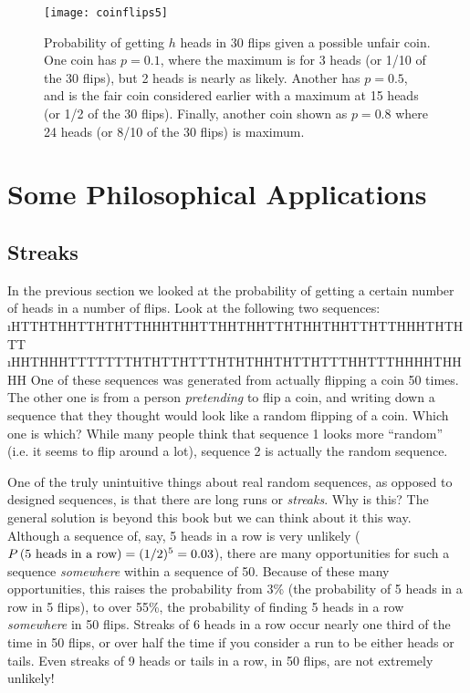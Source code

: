 \begin{figure}
\texttt{[image: coinflips5]}
\label{fig:coinflips5}
\caption{Probability of getting $h$ heads in 30 flips given a possible unfair coin. One coin has $p=0.1$, where the maximum is for 3 heads (or 1/10 of the 30 flips), but 2 heads is nearly as likely.  Another has $p=0.5$, and is the fair coin considered earlier with a maximum at 15 heads (or 1/2 of the 30 flips).  Finally, another coin shown as $p=0.8$ where 24 heads (or 8/10 of the 30 flips) is maximum. }
\end{figure}


\section{Some Philosophical Applications}


\subsection{Streaks}

In the previous section we looked at the probability of getting a certain number of heads in a number of flips.  Look at the following two sequences:
\be
\i HTTHTHHTTHTHTTHHHTHHTTHHTHHTTHTHHTHHTTHTTHHHTHTHTT
\i HHTHHHTTTTTTTHTHTTHTTTHTHTHHTHTTHTTTHHTTTHHHHTHHHH
\ee
One of these sequences was generated from actually flipping a coin 50 times.  The other one is from a person {\em pretending} to flip a coin, and writing down a sequence that they thought would look like a random flipping of a coin.  Which one is which?  While many people think that sequence 1 looks more ``random'' (i.e. it seems to flip around a lot), sequence 2 is actually the random sequence.  

One of the truly unintuitive things about real random sequences, as opposed to designed sequences, is that there are long runs or {\em streaks}.  Why is this?  The general solution is beyond this book but we can think about it this way.  Although a sequence of, say, 5 heads in a row is very unlikely ($\P{5 heads in a row}=(1/2)^{5}=0.03$), there are many opportunities for such a sequence {\em somewhere} within a sequence of 50.  Because of these many opportunities, this raises the probability from 3\% (the probability of 5 heads in a row in 5 flips), to over 55\%, the probability of finding 5 heads in a row {\em somewhere} in 50 flips.  Streaks of 6 heads in a row occur nearly one third of the time in 50 flips, or over half the time if you consider a run to be either heads or tails.  Even streaks of 9 heads or tails in a row, in 50 flips, are not extremely unlikely!
